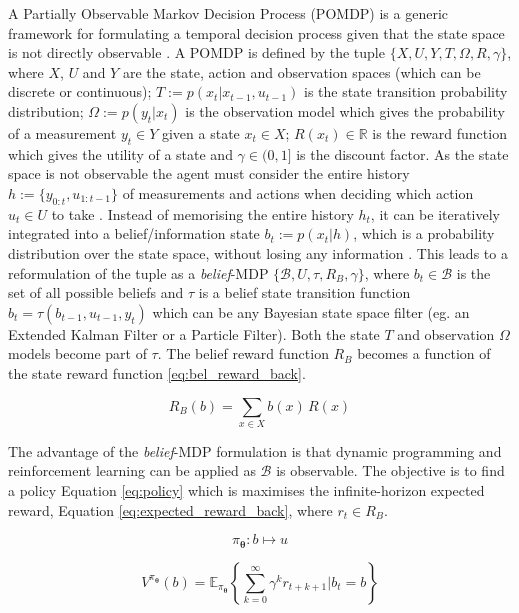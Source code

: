 \documentclass[final,5p,times,twocolumn]{elsarticle}
\newcommand{\Param}{\boldsymbol{\theta}}
\begin{document}
A Partially Observable Markov Decision Process (POMDP) is a generic framework for formulating a temporal decision process 
given that the state space is not directly observable \cite{Sondik_1973}. A POMDP is defined by the tuple $\{X,U,Y,T,\Omega,R,\gamma\}$, 
where $X$, $U$ and $Y$ are the state, action and observation spaces (which can be discrete or continuous);
${T:= p(x_t|x_{t-1},u_{t-1})}$ is the state transition probability distribution; $\Omega := p(y_t|x_t)$ is 
the observation model which gives the probability of a measurement $y_t \in Y$ given a state $x_t \in X$; 
$R(x_t) \in \mathbb{R}$ is the reward function which gives the utility of a state and $\gamma \in (0,1]$ is the discount factor. As the state space is not 
observable the agent must consider the entire history $h := \{y_{0:t},u_{1:t-1}\}$ of measurements and actions
when deciding which action $u_t \in U$ to take \cite{Ross08onlineplanning}. Instead of memorising the entire history $h_t$, 
it can be iteratively integrated into a belief/information state ${b_t := p(x_t|h)}$, which 
is a probability distribution over the state space, without losing any information \cite{Milos_POMDP_2000}.
This leads to a reformulation of the tuple as a \textit{belief}-MDP $\{\mathcal{B},U,\tau,R_B,\gamma\}$, where $b_t \in \mathcal{B}$ is 
the set of all possible beliefs and $\tau$ is a belief state transition function $b_t = \tau(b_{t-1},u_{t-1},y_t)$ 
which can be any Bayesian state space filter (eg. an Extended Kalman Filter or a Particle Filter). Both the state $T$ and observation 
$\Omega$ models become part of $\tau$. The belief reward function $R_B$ becomes a function of the state reward function \ref{eq:bel_reward_back}. 

\begin{equation}\label{eq:bel_reward_back}
  R_B(b) = \sum\limits_{x \in X} b(x)\, R(x)
\end{equation}

The advantage of the \textit{belief}-MDP formulation is that dynamic programming and reinforcement
learning can be applied as $\mathcal{B}$ is observable.  The objective is to find a 
policy Equation \ref{eq:policy} which is maximises the infinite-horizon expected reward, Equation 
\ref{eq:expected_reward_back}, where $r_t \in R_B$. 

\begin{equation}\label{eq:policy}
  \pi_{\Param} : b \mapsto u
\end{equation}

\begin{equation}\label{eq:expected_reward_back}
 V^{\pi_{\Param}}(b) = \mathbb{E}_{\pi_{\Param}} \left\{  \sum^{\infty}_{k=0} \gamma^k r_{t+k+1} \Bigg\lvert b_t = b \right\}
\end{equation}
\end{document}
